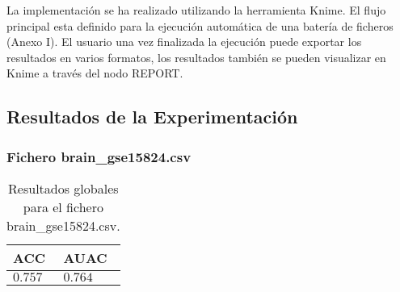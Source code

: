 \bigbreak

La implementación se ha realizado utilizando la herramienta Knime. El flujo principal esta definido para la ejecución automática de una batería de ficheros (Anexo I). El usuario una vez finalizada la ejecución puede exportar los resultados en varios formatos, los resultados también se pueden visualizar en Knime a través del nodo REPORT.

\clearpage

\subsection{Resultados de la Experimentación}

\subsubsection{Fichero brain\_gse15824.csv}

\begin{table}[htp]
    \small
    \centering
    \begin{tabularx}{\columnwidth}{Y Y}
        ACC       & AUAC    \\\hline
        $0.757$   & $0.764$ \\\hline
    \end{tabularx}
    \caption{Resultados globales para el fichero brain\_gse15824.csv.}
    \label{tab:10}
\end{table}

